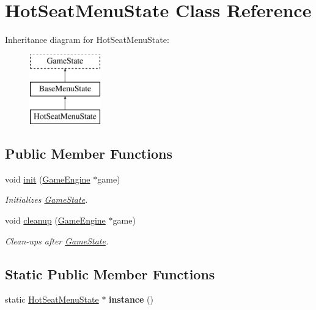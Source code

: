\hypertarget{class_hot_seat_menu_state}{}\section{Hot\+Seat\+Menu\+State Class Reference}
\label{class_hot_seat_menu_state}
Inheritance diagram for Hot\+Seat\+Menu\+State\+:\begin{figure}[H]
\begin{center}
\leavevmode
\includegraphics[height=3.000000cm]{class_hot_seat_menu_state}
\end{center}
\end{figure}
\subsection*{Public Member Functions}
\begin{DoxyCompactItemize}
\item 
\mbox{\label{class_hot_seat_menu_state_a29beb4656c180d0cfc3b8ca20ae2d172}} 
void \mbox{\hyperlink{class_hot_seat_menu_state_a29beb4656c180d0cfc3b8ca20ae2d172}{init}} (\mbox{\hyperlink{class_game_engine}{Game\+Engine}} $\ast$game)
\begin{DoxyCompactList}\small\item\em Initializes \mbox{\hyperlink{class_game_state}{Game\+State}}. \end{DoxyCompactList}\item 
\mbox{\label{class_hot_seat_menu_state_ada87b1a00943777a31b8b24ddf347350}} 
void \mbox{\hyperlink{class_hot_seat_menu_state_ada87b1a00943777a31b8b24ddf347350}{cleanup}} (\mbox{\hyperlink{class_game_engine}{Game\+Engine}} $\ast$game)
\begin{DoxyCompactList}\small\item\em Clean-\/ups after \mbox{\hyperlink{class_game_state}{Game\+State}}. \end{DoxyCompactList}\end{DoxyCompactItemize}
\subsection*{Static Public Member Functions}
\begin{DoxyCompactItemize}
\item 
\mbox{\label{class_hot_seat_menu_state_aaeccf26a726ce9793b0e6acf104c21b6}} 
static \mbox{\hyperlink{class_hot_seat_menu_state}{Hot\+Seat\+Menu\+State}} $\ast$ {\bfseries instance} ()
\end{DoxyCompactItemize}
